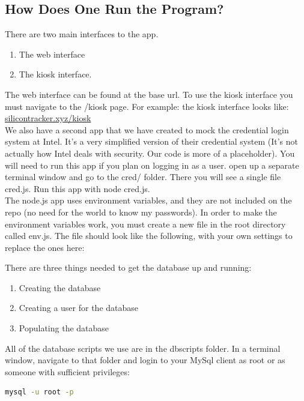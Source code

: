 \documentclass[10pt, onecolumn, twoside, peerreview]{IEEEtran}
\begin{document}
\subsection{How Does One Run the Program?}
There are two main interfaces to the app.\\
\begin{enumerate}
  \item The web interface
  \item The kiosk interface.
\end{enumerate}
The web interface can be found at the base url. To use the kiosk interface you must navigate to the /kiosk page. For example: the kiosk interface looks like: \url{silicontracker.xyz/kiosk}\\

We also have a second app that we have created to mock the credential login system at Intel. It's a very simplified version of their credential system (It's not actually how Intel deals with security. Our code is more of a placeholder). You will need to run this app if you plan on logging in as a user. open up a separate terminal window and go to the cred/ folder. There you will see a single file cred.js. Run this app with node cred.js.\\

The node.js app uses environment variables, and they are not included on the repo (no need for the world to know my passwords). In order to make the environment variables work, you must create a new file in the root directory called env.js.
The file should look like the following, with your own settings to replace the ones here:



There are three things needed to get the database up and running:\\
\begin{enumerate}
  \item Creating the database
  \item Creating a user for the database
  \item Populating the database
\end{enumerate}

All of the database scripts we use are in the dbscripts folder. In a terminal window, navigate to that folder and login to your MySql client as root or as someone with sufficient privileges:
\begin{lstlisting}[language=bash]
mysql -u root -p
\end{lstlisting}
\end{document}
